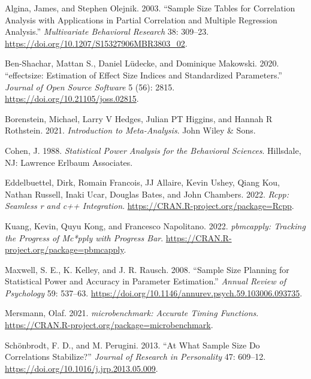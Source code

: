 \hypertarget{refs}{}
\begin{CSLReferences}{1}{0}
\leavevmode{}%
Algina, James, and Stephen Olejnik. 2003. {``Sample Size Tables for Correlation Analysis with Applications in Partial Correlation and Multiple Regression Analysis.''} \emph{Multivariate Behavioral Research} 38: 309--23. \url{https://doi.org/10.1207/S15327906MBR3803_02}.

\leavevmode{}%
Ben-Shachar, Mattan S., Daniel Lüdecke, and Dominique Makowski. 2020. {``{e}ffectsize: Estimation of Effect Size Indices and Standardized Parameters.''} \emph{Journal of Open Source Software} 5 (56): 2815. \url{https://doi.org/10.21105/joss.02815}.

\leavevmode{}%
Borenstein, Michael, Larry V Hedges, Julian PT Higgins, and Hannah R Rothstein. 2021. \emph{Introduction to Meta-Analysis}. John Wiley \& Sons.

\leavevmode{}%
Cohen, J. 1988. \emph{Statistical Power Analysis for the Behavioral Sciences}. {Hillsdale, NJ}: {Lawrence Erlbaum Associates}.

\leavevmode{}%
Eddelbuettel, Dirk, Romain Francois, JJ Allaire, Kevin Ushey, Qiang Kou, Nathan Russell, Inaki Ucar, Douglas Bates, and John Chambers. 2022. \emph{Rcpp: Seamless r and c++ Integration}. \url{https://CRAN.R-project.org/package=Rcpp}.

\leavevmode{}%
Kuang, Kevin, Quyu Kong, and Francesco Napolitano. 2022. \emph{{pbmcapply}: Tracking the Progress of Mc*pply with Progress Bar}. \url{https://CRAN.R-project.org/package=pbmcapply}.

\leavevmode{}%
Maxwell, S. E., K. Kelley, and J. R. Rausch. 2008. {``Sample Size Planning for Statistical Power and Accuracy in Parameter Estimation.''} \emph{Annual Review of Psychology} 59: 537--63. \url{https://doi.org/10.1146/annurev.psych.59.103006.093735}.

\leavevmode{}%
Mersmann, Olaf. 2021. \emph{{microbenchmark}: Accurate Timing Functions}. \url{https://CRAN.R-project.org/package=microbenchmark}.

\leavevmode{}%
Schönbrodt, F. D., and M. Perugini. 2013. {``At What Sample Size Do Correlations Stabilize?''} \emph{Journal of Research in Personality} 47: 609--12. \url{https://doi.org/10.1016/j.jrp.2013.05.009}.


\end{CSLReferences}
